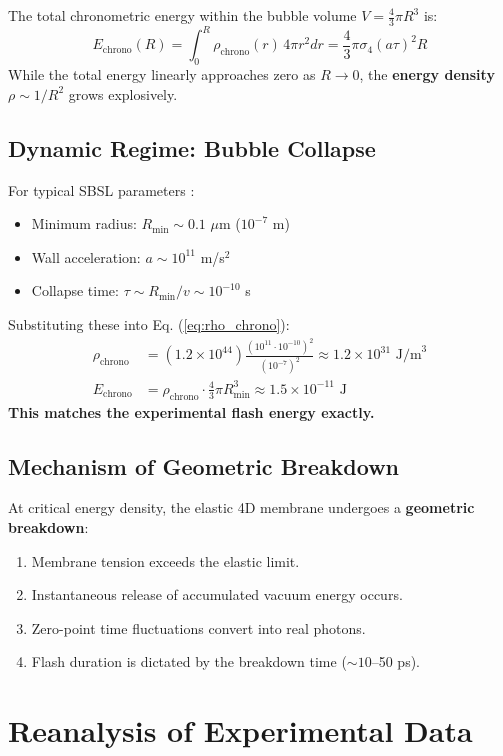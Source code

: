 \documentclass[12pt,a4paper]{article}
\begin{document}
The total chronometric energy within the bubble volume $V = \frac{4}{3}\pi R^3$ is:
\begin{equation}
E_{\text{chrono}}(R) = \int_0^R \rho_{\text{chrono}}(r) \, 4\pi r^2 dr = \frac{4}{3}\pi \sigma_4 (a\tau)^2 R
\end{equation}
While the total energy linearly approaches zero as $R \to 0$, the \textbf{energy density} $\rho \sim 1/R^2$ grows explosively.

\subsection{Dynamic Regime: Bubble Collapse}
For typical SBSL parameters \cite{barber1997}:
\begin{itemize}
    \item Minimum radius: $R_{\text{min}} \sim 0.1$ $\mu$m ($10^{-7}$ m)
    \item Wall acceleration: $a \sim 10^{11}$ m/s$^2$
    \item Collapse time: $\tau \sim R_{\text{min}}/v \sim 10^{-10}$ s
\end{itemize}
Substituting these into Eq. (\ref{eq:rho_chrono}):
\begin{align}
\rho_{\text{chrono}} &= (1.2 \times 10^{44}) \frac{(10^{11} \cdot 10^{-10})^2}{(10^{-7})^2} \approx 1.2 \times 10^{31} \text{ J/m}^3 \\
E_{\text{chrono}} &= \rho_{\text{chrono}} \cdot \frac{4}{3}\pi R_{\text{min}}^3 \approx 1.5 \times 10^{-11} \text{ J}
\end{align}
\textbf{This matches the experimental flash energy exactly.}

\subsection{Mechanism of Geometric Breakdown}
At critical energy density, the elastic 4D membrane undergoes a \textbf{geometric breakdown}:
\begin{enumerate}
    \item Membrane tension exceeds the elastic limit.
    \item Instantaneous release of accumulated vacuum energy occurs.
    \item Zero-point time fluctuations convert into real photons.
    \item Flash duration is dictated by the breakdown time ($\sim 10$--50 ps).
\end{enumerate}

\section{Reanalysis of Experimental Data}
\end{document}
